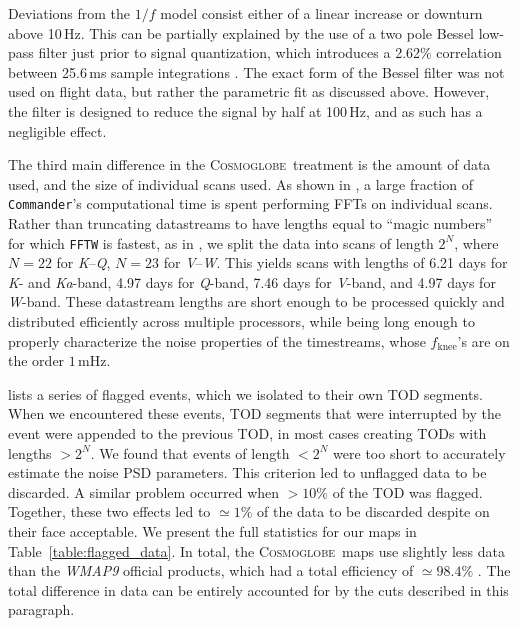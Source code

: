 \documentclass[twocolumn]{../../common/aa}
\def\commander{\texttt{Commander}}
\newcommand{\Cosmoglobe}{\textsc{Cosmoglobe}}
\newcommand{\K}[0]{\textit K}
\newcommand{\Ka}[0]{\textit{Ka}}
\newcommand{\Q}[0]{\textit Q}
\newcommand{\V}[0]{\textit V}
\newcommand{\W}[0]{\textit W}
\begin{document}
Deviations from the $1/f$ model consist either of a linear increase or downturn
above 10\,Hz. This can be partially explained by the use of a two pole Bessel
low-pass filter just prior to signal quantization, which introduces a 2.62\%
correlation between 25.6\,ms sample integrations
\citep[][Sect.~5.3]{jarosik2003:MAP}. The exact form of the Bessel filter was
not used on flight data, but rather the parametric fit as discussed above.
However, the filter is designed to reduce the signal by half at 100\,Hz, and as
such has a negligible effect. 








The third main difference in the \Cosmoglobe\ treatment is the amount of data used, and the size of individual scans used. 
As shown in \citet{bp03}, a large fraction of \commander's computational time is spent performing FFTs on individual scans. Rather than truncating datastreams to have lengths equal to ``magic numbers'' for which \texttt{FFTW} \citep{FFTW05} is fastest, as in \citet{bp03}, 
we split the data into scans of length $2^N$, where $N=22$ for \K--\Q, $N=23$ for \V--\W. This yields scans with lengths of 6.21 days for \K- and \Ka-band, 4.97 days for \Q-band, 7.46 days for \V-band, and 4.97 days for \W-band.
These datastream lengths are short enough to be processed quickly and distributed efficiently across multiple processors, while being long enough to properly characterize the noise properties of the timestreams, whose $f_\mathrm{knee}$'s are on the order $1\,\mathrm{mHz}$.

\citet{wmapexsupp} lists a series of flagged events, which we isolated to their own TOD segments. When we encountered these events, TOD segments that were interrupted by the event were appended to the previous TOD, in most cases creating TODs with lengths $>2^N$. We found that events of length $<2^N$ were too short to accurately estimate the noise PSD parameters. This criterion led to unflagged data to be discarded. A similar problem occurred when $>10\%$ of the TOD was flagged. Together, these two effects led to $\simeq1\%$ of the data to be discarded despite on their face acceptable. We present the full statistics for our maps in Table~\ref{table:flagged_data}. In total, the \Cosmoglobe\ maps use slightly less data than the \textit{WMAP9} official products, which had a total efficiency of $\simeq98.4\%$ \citep{bennett2012}. The total difference in data can be entirely accounted for by the cuts described in this paragraph.
\end{document}
